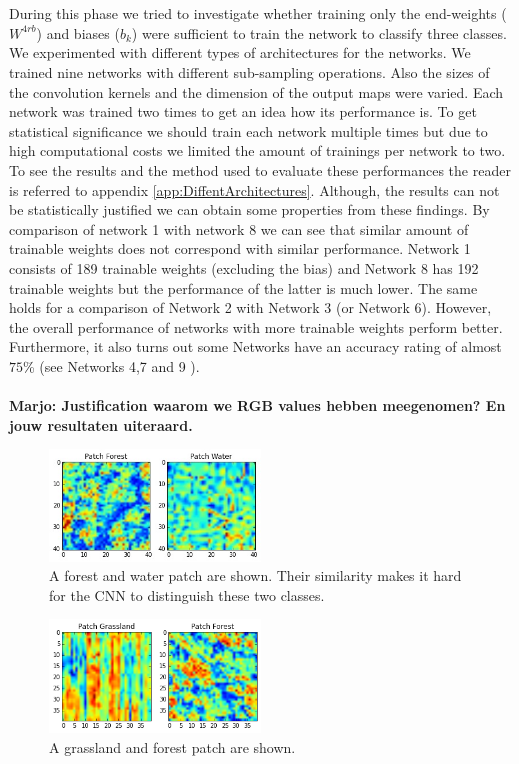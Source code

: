 \documentclass[a4paper,onecolumn]{report}
\begin{document}
\\\\
During this phase we tried to investigate whether training only the end-weights ($W^{4rb}$) and biases ($b_{k}$) were sufficient to train the network to classify three classes. We experimented with different types of architectures for the networks. We trained nine networks with different sub-sampling operations. Also the sizes of the convolution kernels and the dimension of the output maps were varied. Each network was trained two times to get an idea how its performance is. To get statistical significance we should train each network multiple times but due to high computational costs we limited the amount of trainings per network to two. To see the results and the method used to evaluate these performances the reader is referred to appendix \ref{app:DiffentArchitectures}. Although, the results can not be statistically justified we can obtain some properties from these findings. By comparison of network 1 with network 8 we can see that similar amount of trainable weights does not correspond with similar performance. Network 1 consists of 189 trainable weights (excluding the bias) and Network 8 has 192  trainable weights but the performance of the latter is much lower. The same holds for a comparison of Network 2 with Network 3 (or Network 6). However, the overall performance of networks with more trainable weights perform better. Furthermore, it also turns out some Networks have an accuracy rating of almost $75$\% (see Networks 4,7 and 9 ). 
\\\\
\textbf{Marjo: Justification waarom we RGB values hebben meegenomen? En jouw resultaten uiteraard. }
\begin{figure}[bth]
	\centering
	\includegraphics[width=0.5\textwidth]{./images/WaterForestPatch.jpg}
	\caption{A forest and water patch are shown. Their similarity makes it hard for the CNN to distinguish these two classes.}
	\label{fig:WaterForestPatch}
\end{figure}
\begin{figure}[bth!]
	\centering
	\includegraphics[width=0.5\textwidth]{./images/GrassForestPatch.jpg}
	\caption{A grassland and forest patch are shown.}
	\label{fig:GrassForestPatch}
\end{figure}
\\\\
\end{document}
